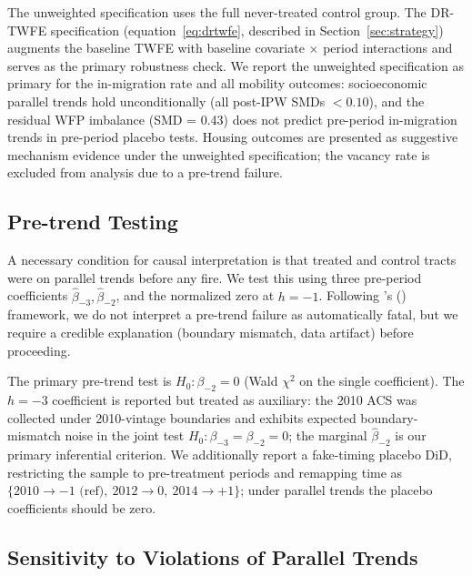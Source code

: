 \documentclass[12pt]{article}
\begin{document}
The unweighted specification uses the full never-treated control group.
The DR-TWFE specification (equation~\eqref{eq:drtwfe}, described in
Section~\ref{sec:strategy}) augments the baseline TWFE with
baseline covariate $\times$ period interactions and serves as the
primary robustness check.
We report the unweighted specification as primary for the in-migration
rate and all mobility outcomes: socioeconomic parallel trends hold
unconditionally (all post-IPW SMDs $< 0.10$), and the residual WFP
imbalance (SMD = 0.43) does not predict pre-period in-migration trends
in pre-period placebo tests.
Housing outcomes are presented as suggestive mechanism evidence
under the unweighted specification; the vacancy rate is excluded
from analysis due to a pre-trend failure.

\subsection{Pre-trend Testing}

A necessary condition for causal interpretation is that treated and
control tracts were on parallel trends before any fire.
We test this using three pre-period coefficients
$\hat{\beta}_{-3}, \hat{\beta}_{-2}$, and the normalized zero at $h = -1$.
Following \citeauthor{roth2022pretest}'s (\citeyear{roth2022pretest})
framework, we do not interpret a pre-trend failure as automatically fatal,
but we require a credible explanation (boundary mismatch,
data artifact) before proceeding.

The primary pre-trend test is $H_0 \colon \beta_{-2} = 0$
(Wald $\chi^2$ on the single coefficient).
The $h = -3$ coefficient is reported but treated as auxiliary:
the 2010 ACS was collected under 2010-vintage boundaries
and exhibits expected boundary-mismatch noise in the
joint test $H_0 \colon \beta_{-3} = \beta_{-2} = 0$;
the marginal $\hat{\beta}_{-2}$ is our primary inferential criterion.
We additionally report a fake-timing placebo DiD,
restricting the sample to pre-treatment periods and remapping time as
$\{2010 \to -1 \text{ (ref)},\ 2012 \to 0,\ 2014 \to +1\}$;
under parallel trends the placebo coefficients should be zero.

\subsection{Sensitivity to Violations of Parallel Trends}
\end{document}
